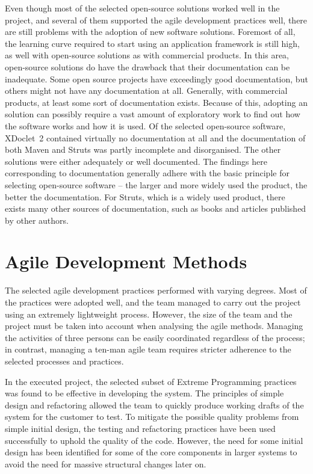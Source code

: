 Even though most of the selected open-source solutions worked well in 
the project, and several of them supported the agile development 
practices well, there are still problems with the adoption of new 
software solutions. Foremost of all, the learning curve required to 
start using an application framework is still high, as well with 
open-source solutions as with commercial products. In this area, 
open-source solutions do have the drawback that their documentation 
can be inadequate. Some open source projects have exceedingly good 
documentation, but others might not have any documentation at all. 
Generally, with commercial products, at least some sort of 
documentation exists. Because of this, adopting an  
solution can possibly require a vast amount of exploratory work to 
find out how the software works and how it is used. Of the selected 
open-source software, XDoclet~2 contained virtually no documentation 
at all and the documentation of both Maven and Struts was partly 
incomplete and disorganised. The other solutions were either 
adequately or well documented. The findings here corresponding to 
documentation generally adhere with the basic principle for selecting 
open-source software -- the larger and more widely used the product, 
the better the documentation. For Struts, which is a widely used 
product, there exists many other sources of documentation, such as 
books and articles published by other authors.


\section{Agile Development Methods}
\label{toc:conclusions:agile}

The selected agile development practices performed with varying 
degrees. Most of the practices were adopted well, and the team managed 
to carry out the project using an extremely lightweight process. 
However, the size of the team and the project must be taken into 
account when analysing the agile methods. Managing the activities of 
three persons can be easily coordinated regardless of the process; in 
contrast, managing a ten-man agile team requires stricter adherence to 
the selected processes and practices.

In the executed project, the selected subset of Extreme Programming 
practices was found to be effective in developing the system. The 
principles of simple design and refactoring allowed the team to 
quickly produce working drafts of the system for the customer to test. 
To mitigate the possible quality problems from simple initial design, 
the testing and refactoring practices have been used successfully to 
uphold the quality of the code. However, the need for some initial 
design has been identified for some of the core components in larger 
systems to avoid the need for massive structural changes later on. 

